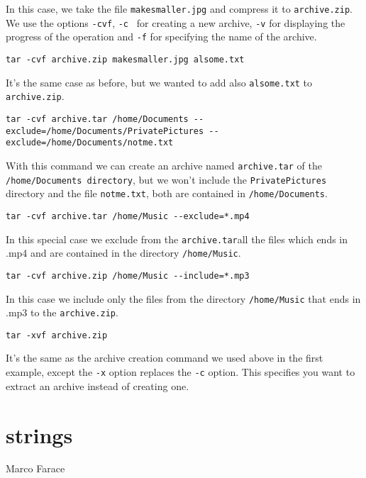 \documentclass[hidelinks,12pt,a4paper,numbers=enddot]{scrartcl}
\begin{document}
In this case, we take the file \texttt{makesmaller.jpg} and compress it
to \texttt{archive.zip}. We use the options \texttt{-cvf}, \texttt{-c }
for creating a new archive, \texttt{-v} for displaying the progress of the
operation and \texttt{-f} for specifying the name of the archive.

\begin{verbatim}
tar -cvf archive.zip makesmaller.jpg alsome.txt
\end{verbatim}
It's the same case as before, but we wanted to add also \texttt{alsome.txt}
to \texttt{archive.zip}.

\begin{verbatim}
tar -cvf archive.tar /home/Documents --exclude=/home/Documents/PrivatePictures --exclude=/home/Documents/notme.txt
\end{verbatim}

With this command we can create an archive named \texttt{archive.tar} of
the \texttt{/home/Documents directory}, but we won't include the
\texttt{PrivatePictures} directory and the file \texttt{notme.txt},
both are contained in \texttt{/home/Documents}.

\begin{verbatim}
tar -cvf archive.tar /home/Music --exclude=*.mp4
\end{verbatim}

In this special case we exclude from the \texttt{archive.tar}all the
files which ends in .mp4 and are contained in the directory \texttt{/home/Music}.

\begin{verbatim}
tar -cvf archive.zip /home/Music --include=*.mp3
\end{verbatim}

In this case we include only the files from the directory \texttt{/home/Music}
that ends in .mp3 to the \texttt{archive.zip}.

\begin{verbatim}
tar -xvf archive.zip
\end{verbatim}
It's the same as the archive creation command we used above in the first
example, except the \texttt{-x} option replaces the \texttt{-c} option.
This specifies you want to extract an archive instead of creating one.

\section{strings}


\large Marco Farace \normalsize\\
\end{document}
